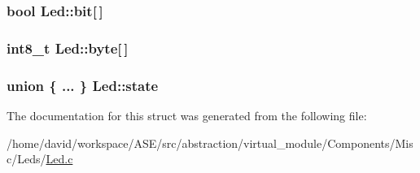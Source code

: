 \hypertarget{structLed_d13200d974e7d589b1e2428e5a47fd9f}{
\subsubsection{\setlength{\rightskip}{0pt plus 5cm}bool {\bf Led::bit}\mbox{[}$\,$\mbox{]}}}
\label{structLed_d13200d974e7d589b1e2428e5a47fd9f}


\hypertarget{structLed_2da7b4719c7df53cfca3e799385f0ab4}{
\subsubsection{\setlength{\rightskip}{0pt plus 5cm}int8\_\-t {\bf Led::byte}\mbox{[}$\,$\mbox{]}}}
\label{structLed_2da7b4719c7df53cfca3e799385f0ab4}


\hypertarget{structLed_1691c11d2cb03a7b4cbd5f094f68205c}{
\subsubsection{\setlength{\rightskip}{0pt plus 5cm}union \{ ... \}   {\bf Led::state}}}
\label{structLed_1691c11d2cb03a7b4cbd5f094f68205c}




The documentation for this struct was generated from the following file:\begin{CompactItemize}
\item 
/home/david/workspace/ASE/src/abstraction/virtual\_\-module/Components/Misc/Leds/\hyperlink{Led_8c}{Led.c}\end{CompactItemize}
